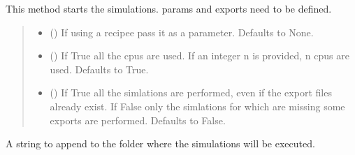 \documentclass[letterpaper,10pt,english]{sphinxmanual}
\begin{document}
\begin{fulllineitems}
\begin{fulllineitems}
\label{\detokenize{index:raypyng.simulate.Simulate.run}}
\pysigstartsignatures
{}
\pysigstopsignatures
\sphinxAtStartPar
This method starts the simulations. params and exports need to be defined.
\begin{quote}\begin{description}
\begin{itemize}
\item {} 
\sphinxAtStartPar
{} (\sphinxstyleliteralemphasis{\sphinxupquote{, }}) \textendash{} If using a recipee pass it as a parameter. Defaults to None.

\item {} 
\sphinxAtStartPar
{} (\sphinxstyleliteralemphasis{\sphinxupquote{, }}) \textendash{} If True all the cpus are used. If an integer n is provided, n cpus are used. Defaults to True.

\item {} 
\sphinxAtStartPar
{} (\sphinxstyleliteralemphasis{\sphinxupquote{, }}) \textendash{} If True all the simlations are performed, even if the export files already exist. If False only the simlations for which are missing some exports are performed. Defaults to False.

\end{itemize}

\end{description}\end{quote}

\end{fulllineitems}


\begin{fulllineitems}
\label{\detokenize{index:raypyng.simulate.Simulate.simulation_name}}
\pysigstartsignatures
{}
\pysigstopsignatures
\sphinxAtStartPar
A string to append to the folder where the simulations will be executed.

\end{fulllineitems}


\end{fulllineitems}
\end{document}
